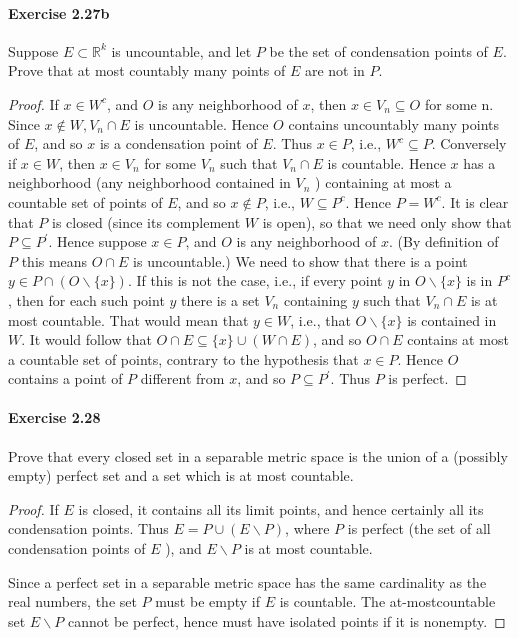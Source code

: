 \documentclass{article}
\theoremstyle{definition}
\begin{document}
\paragraph{Exercise 2.27b} Suppose $E\subset\mathbb{R}^k$ is uncountable, and let $P$ be the set of condensation points of $E$. Prove that at most countably many points of $E$ are not in $P$.
\begin{proof}
    If $x \in W^c$, and $O$ is any neighborhood of $x$, then $x \in V_n \subseteq O$ for some n. Since $x \notin W, V_n \cap E$ is uncountable. Hence $O$ contains uncountably many points of $E$, and so $x$ is a condensation point of $E$. Thus $x \in P$, i.e., $W^c \subseteq P$.
Conversely if $x \in W$, then $x \in V_n$ for some $V_n$ such that $V_n \cap E$ is countable. Hence $x$ has a neighborhood (any neighborhood contained in $V_n$ ) containing at most a countable set of points of $E$, and so $x \notin P$, i.e., $W \subseteq P^c$. Hence $P=W^c$.
It is clear that $P$ is closed (since its complement $W$ is open), so that we need only show that $P \subseteq P^{\prime}$. Hence suppose $x \in P$, and $O$ is any neighborhood of $x$. (By definition of $P$ this means $O \cap E$ is uncountable.) We need to show that there is a point $y \in P \cap(O \backslash\{x\})$. If this is not the case, i.e., if every point $y$ in $O \backslash\{x\}$ is in $P^c$, then for each such point $y$ there is a set $V_n$ containing $y$ such that $V_n \cap E$ is at most countable. That would mean that $y \in W$, i.e., that $O \backslash\{x\}$ is contained in $W$. It would follow that $O \cap E \subseteq\{x\} \cup(W \cap E)$, and so $O \cap E$ contains at most a countable set of points, contrary to the hypothesis that $x \in P$. Hence $O$ contains a point of $P$ different from $x$, and so $P \subseteq P^{\prime}$. Thus $P$ is perfect.
\end{proof}


\paragraph{Exercise 2.28} Prove that every closed set in a separable metric space is the union of a (possibly empty) perfect set and a set which is at most countable.
\begin{proof}
    If $E$ is closed, it contains all its limit points, and hence certainly all its condensation points. Thus $E=P \cup(E \backslash P)$, where $P$ is perfect (the set of all condensation points of $E$ ), and $E \backslash P$ is at most countable.

Since a perfect set in a separable metric space has the same cardinality as the real numbers, the set $P$ must be empty if $E$ is countable. The at-mostcountable set $E \backslash P$ cannot be perfect, hence must have isolated points if it is nonempty.
\end{proof}
\end{document}
